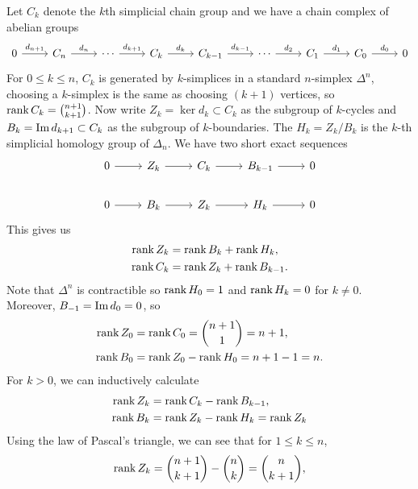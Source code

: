 \documentclass[a4paper, 12pt]{article}
\begin{document}
\begin{solution}
Let \(C_k\) denote the \(k\)th simplicial chain group and we have a chain complex of abelian groups 
\[\begin{tikzcd}
	0 & {C_n} & \cdots & {C_k} & {C_{k-1}} & \cdots & {C_1} & {C_0} & 0
	\arrow["{d_{n+1}}", from=1-1, to=1-2]
	\arrow["{d_n}", from=1-2, to=1-3]
	\arrow["{d_{k+1}}", from=1-3, to=1-4]
	\arrow["{d_k}", from=1-4, to=1-5]
	\arrow["{d_{k-1}}", from=1-5, to=1-6]
	\arrow["{d_2}", from=1-6, to=1-7]
	\arrow["{d_1}", from=1-7, to=1-8]
	\arrow["{d_0}", from=1-8, to=1-9]
\end{tikzcd}\]
For \(0\leq k\leq n\), \(C_k\) is generated by \(k\)-simplices in a standard \(n\)-simplex \(\Delta^n\), choosing a \(k\)-simplex is the same as choosing \((k+1)\) vertices, so \(\text{rank}\, C_k=\binom{n+1}{k+1}\). Now write 
\(Z_k=\ker d_k\subset C_k\) as the subgroup of \(k\)-cycles and \(B_k=\text{Im}\, d_{k+1}\subset C_k\) as the subgroup of \(k\)-boundaries. The \(H_k=Z_k/B_k\) is the \(k\)-th simplicial homology group of \(\Delta_n\). We have two short exact sequences 
\[\begin{tikzcd}
	0 & {Z_k} & {C_k} & {B_{k-1}} & 0 \\
	0 & {B_k} & {Z_k} & {H_k} & 0
	\arrow[from=1-1, to=1-2]
	\arrow[from=1-2, to=1-3]
	\arrow[from=1-3, to=1-4]
	\arrow[from=1-4, to=1-5]
	\arrow[from=2-1, to=2-2]
	\arrow[from=2-2, to=2-3]
	\arrow[from=2-3, to=2-4]
	\arrow[from=2-4, to=2-5]
\end{tikzcd}\]
This gives us 
\begin{align*}
    \text{rank}\, Z_k&=\text{rank}\, B_k+\text{rank}\, H_k,\\ 
    \text{rank}\, C_k&=\text{rank}\, Z_k+\text{rank}\, B_{k-1}.
\end{align*}
Note that \(\Delta^n\) is contractible so \(\text{rank}\, H_0=1\) and \(\text{rank}\, H_k=0\) for \(k\neq 0\). Moreover, \(B_{-1}=\text{Im}\, d_0=0\), so 
\begin{align*}
    \text{rank}\, Z_0&=\text{rank}\, C_0=\binom{n+1}{1}=n+1,\\
    \text{rank}\, B_0&=\text{rank}\, Z_0-\text{rank}\, H_0=n+1-1=n.
\end{align*}
For \(k>0\), we can inductively calculate 
\begin{align*}
    \text{rank}\, Z_k&=\text{rank}\, C_k-\text{rank}\, B_{k-1},\\
    \text{rank}\, B_k&=\text{rank}\, Z_k-\text{rank}\, H_k=\text{rank}\, Z_k
\end{align*}
Using the law of Pascal's triangle, we can see that for \(1\leq k\leq n\),  
\begin{align*}
    \rank Z_k&=\binom{n+1}{k+1}-\binom{n}{k}=\binom{n}{k+1},\\ 

\end{align*}
\end{solution}
\end{document}
